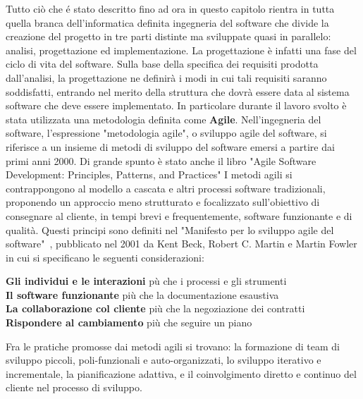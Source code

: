 {Tutto ci\`o che \'e stato descritto fino ad ora in questo capitolo rientra in tutta quella branca dell'informatica definita ingegneria del software che divide la creazione del progetto in tre parti distinte ma sviluppate quasi in parallelo: analisi, progettazione ed implementazione. La progettazione \`e infatti una fase del ciclo di vita del software. Sulla base della specifica dei requisiti prodotta dall'analisi, la progettazione ne definir\`a i modi in cui tali requisiti saranno soddisfatti, entrando nel merito della struttura che dovr\`a essere data al sistema software che deve essere implementato. In particolare durante il lavoro svolto \`e stata utilizzata una metodologia definita come \textbf{Agile}.
Nell'ingegneria del software, l'espressione "metodologia agile", o sviluppo agile del software, si riferisce a un insieme di metodi di sviluppo del software emersi a partire dai primi anni 2000. Di grande spunto \`e stato anche il libro "Agile Software Development: Principles, Patterns, and Practices"\cite{AG:02} I metodi agili si contrappongono al modello a cascata e altri processi software tradizionali, proponendo un approccio meno strutturato e focalizzato sull'obiettivo di consegnare al cliente, in tempi brevi e frequentemente, software funzionante e di qualit\`a.
Questi principi sono definiti nel "Manifesto per lo sviluppo agile del software"~\cite{agile2001},
pubblicato nel 2001 da Kent Beck, Robert C. Martin e Martin Fowler in cui si specificano le seguenti considerazioni:\\
\begin{center}
	\textbf{Gli individui e le interazioni} p\`u che i processi e gli strumenti\\
	\textbf{Il software funzionante} pi\`u che la documentazione esaustiva\\
	\textbf{La collaborazione col cliente} pi\`u che la negoziazione dei contratti\\
	\textbf{Rispondere al cambiamento} pi\`u che seguire un piano\\
\end{center}

Fra le pratiche promosse dai metodi agili si trovano: la formazione di team di sviluppo piccoli, poli-funzionali e auto-organizzati, lo sviluppo iterativo e incrementale, la pianificazione adattiva, e il coinvolgimento diretto e continuo del cliente nel processo di sviluppo.
}